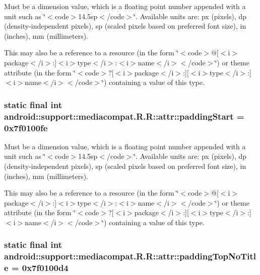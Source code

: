 Must be a dimension value, which is a floating point number appended with a unit such as \char`\"{}$<$code$>$14.5sp$<$/code$>$\char`\"{}. Available units are: px (pixels), dp (density-independent pixels), sp (scaled pixels based on preferred font size), in (inches), mm (millimeters). 

This may also be a reference to a resource (in the form \char`\"{}$<$code$>$@\mbox{[}$<$i$>$package$<$/i$>$:\mbox{]}$<$i$>$type$<$/i$>$:$<$i$>$name$<$/i$>$$<$/code$>$\char`\"{}) or theme attribute (in the form \char`\"{}$<$code$>$?\mbox{[}$<$i$>$package$<$/i$>$:\mbox{]}\mbox{[}$<$i$>$type$<$/i$>$:\mbox{]}$<$i$>$name$<$/i$>$$<$/code$>$\char`\"{}) containing a value of this type. \hypertarget{classandroid_1_1support_1_1mediacompat_1_1_r_1_1attr_2d297223ce0706306ce42d7ce3790bd6}{
\subsubsection[{paddingStart}]{\setlength{\rightskip}{0pt plus 5cm}static final int android::support::mediacompat.R.R::attr::paddingStart = 0x7f0100fe}}
\label{classandroid_1_1support_1_1mediacompat_1_1_r_1_1attr_2d297223ce0706306ce42d7ce3790bd6}


Must be a dimension value, which is a floating point number appended with a unit such as \char`\"{}$<$code$>$14.5sp$<$/code$>$\char`\"{}. Available units are: px (pixels), dp (density-independent pixels), sp (scaled pixels based on preferred font size), in (inches), mm (millimeters). 

This may also be a reference to a resource (in the form \char`\"{}$<$code$>$@\mbox{[}$<$i$>$package$<$/i$>$:\mbox{]}$<$i$>$type$<$/i$>$:$<$i$>$name$<$/i$>$$<$/code$>$\char`\"{}) or theme attribute (in the form \char`\"{}$<$code$>$?\mbox{[}$<$i$>$package$<$/i$>$:\mbox{]}\mbox{[}$<$i$>$type$<$/i$>$:\mbox{]}$<$i$>$name$<$/i$>$$<$/code$>$\char`\"{}) containing a value of this type. \hypertarget{classandroid_1_1support_1_1mediacompat_1_1_r_1_1attr_ed0fe7aa54c49c55d864979cd4ee4826}{
\subsubsection[{paddingTopNoTitle}]{\setlength{\rightskip}{0pt plus 5cm}static final int android::support::mediacompat.R.R::attr::paddingTopNoTitle = 0x7f0100d4}}
\label{classandroid_1_1support_1_1mediacompat_1_1_r_1_1attr_ed0fe7aa54c49c55d864979cd4ee4826}



